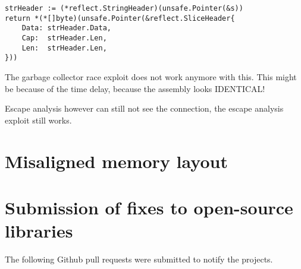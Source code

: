 \begin{lstlisting}[language=Golang, label=lst:cast-1-statement, caption=Unsafe slice cast in one single statement]
strHeader := (*reflect.StringHeader)(unsafe.Pointer(&s))
return *(*[]byte)(unsafe.Pointer(&reflect.SliceHeader{
    Data: strHeader.Data,
    Cap:  strHeader.Len,
    Len:  strHeader.Len,
}))
\end{lstlisting}

The garbage collector race exploit does not work anymore with this.
This might be because of the time delay, because the assembly looks IDENTICAL!

Escape analysis however can still not see the connection, the escape analysis exploit still works.



\section{Misaligned memory layout}\label{sec:vulnerability-alignment}



\section{Submission of fixes to open-source libraries}\label{sec:vulnerability-fixes}

The following Github pull requests were submitted to notify the projects.

